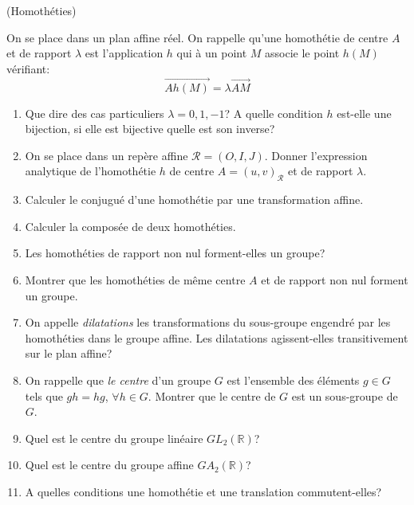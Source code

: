 \documentclass[a4paper,12pt,reqno]{amsart}
\begin{document}
\begin{exo} (Homothéties)

  On se place dans un plan affine réel. On rappelle qu'une homothétie de centre $A$ et de rapport $\lambda$ est l'application $h$ qui à un point $M$ associe le point $h(M)$ vérifiant:
    \[
      \overrightarrow{Ah(M)}=\lambda\overrightarrow{AM}
    \]

  \begin{enumerate}
    \item Que dire des cas particuliers $\lambda=0,1,-1$? A quelle condition $h$ est-elle une bijection, si elle est bijective quelle est son inverse?

    \item On se place dans un repère affine $\mathcal{R}=(O,I,J)$. Donner l'expression analytique de l'homothétie $h$ de centre $A=(u,v)_{\mathcal{R}}$ et de rapport $\lambda$.

    \item Calculer le conjugué d'une homothétie par une transformation affine.

    \item Calculer la composée de deux homothéties.

    \item Les homothéties de rapport non nul forment-elles un groupe?

    \item Montrer que les homothéties de même centre $A$ et de rapport non nul forment un groupe.

    \item On appelle \textit{dilatations} les transformations du sous-groupe engendré par les homothéties dans le groupe affine. Les dilatations agissent-elles transitivement sur le plan affine?

    \item On rappelle que \textit{le centre} d'un groupe $G$ est l'ensemble des éléments $g\in G$ tels que $gh=hg$, $\forall h\in G$. Montrer que le centre de $G$ est un sous-groupe de $G$.

    \item Quel est le centre du groupe linéaire $GL_{2}(\mathbb{R})$?

    \item Quel est le centre du groupe affine $GA_{2}(\mathbb{R})$?

    \item A quelles conditions une homothétie et une translation commutent-elles?
  \end{enumerate}
\end{exo}
\end{document}
